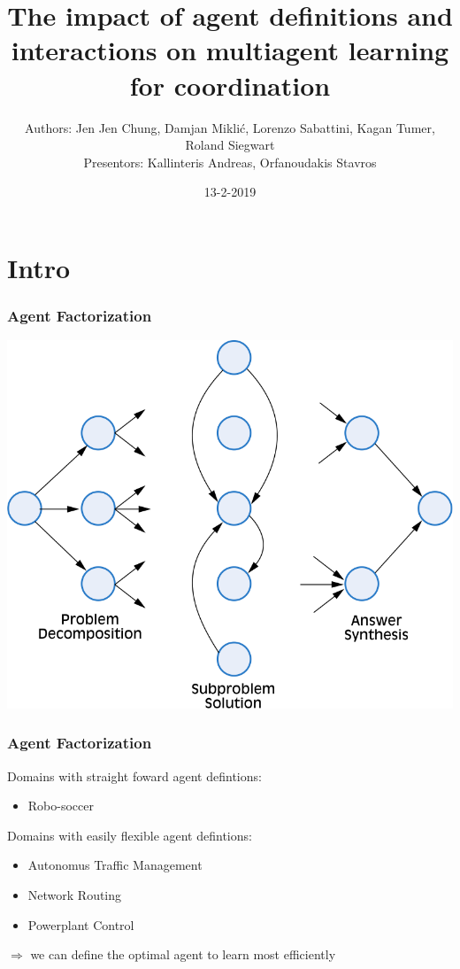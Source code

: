 \documentclass{beamer}
\title{The impact of agent definitions and interactions on multiagent learning for coordination} %
\author{Authors: Jen Jen Chung, Damjan Miklić, Lorenzo Sabattini, Kagan Tumer, Roland Siegwart
\\ Presentors: Kallinteris Andreas, Orfanoudakis Stavros}
\date{13-2-2019} %
\begin{document}
	\begin{frame}
		\maketitle %
	\end{frame}

	\section{Intro}
	\begin{frame}
		\frametitle{Agent Factorization}
		\includegraphics[width=\textwidth]{agent-factor.png}
	\end{frame}
	\begin{frame}
		\frametitle{Agent Factorization}
		Domains with straight foward agent defintions:
		\begin{itemize}
			\item Robo-soccer
		\end{itemize}
		Domains with easily flexible agent defintions:
		\begin{itemize}
			\item Autonomus Traffic Management
			\item Network Routing
			\item Powerplant Control
		\end{itemize}
		$\Rightarrow$ we can define the optimal agent to learn most efficiently
	\end{frame}
\end{document}
